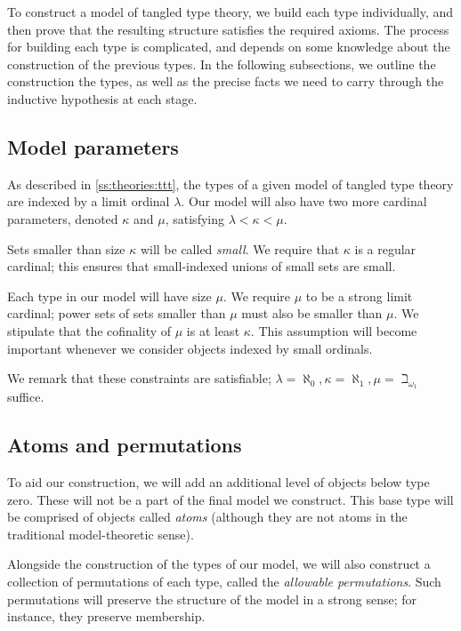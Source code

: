To construct a model of tangled type theory, we build each type individually, and then prove that the resulting structure satisfies the required axioms.
The process for building each type is complicated, and depends on some knowledge about the construction of the previous types.
In the following subsections, we outline the construction the types, as well as the precise facts we need to carry through the inductive hypothesis at each stage.

\subsection{Model parameters}
\label{ss:outline:params}

As described in \cref{ss:theories:ttt}, the types of a given model of tangled type theory are indexed by a limit ordinal \( \lambda \).
Our model will also have two more cardinal parameters, denoted \( \kappa \) and \( \mu \), satisfying \( \lambda < \kappa < \mu \).

Sets smaller than size \( \kappa \) will be called \emph{small}.
We require that \( \kappa \) is a regular cardinal; this ensures that small-indexed unions of small sets are small.

Each type in our model will have size \( \mu \).
We require \( \mu \) to be a strong limit cardinal; power sets of sets smaller than \( \mu \) must also be smaller than \( \mu \).
We stipulate that the cofinality of \( \mu \) is at least \( \kappa \).
This assumption will become important whenever we consider objects indexed by small ordinals.

We remark that these constraints are satisfiable; \( \lambda = \aleph_0, \kappa = \aleph_1, \mu = \beth_{\omega_1} \) suffice.

\subsection{Atoms and permutations}
\label{ss:outline:atoms}

To aid our construction, we will add an additional level of objects below type zero.
These will not be a part of the final model we construct.
This base type will be comprised of objects called \emph{atoms} (although they are not atoms in the traditional model-theoretic sense).

Alongside the construction of the types of our model, we will also construct a collection of permutations of each type, called the \emph{allowable permutations}.
Such permutations will preserve the structure of the model in a strong sense; for instance, they preserve membership.

